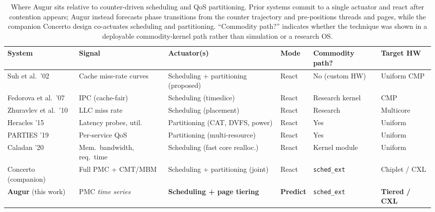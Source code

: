 \documentclass[sigconf,nonacm]{acmart}
\begin{document}
\begin{table}[t]
\centering
\footnotesize
\setlength{\tabcolsep}{6pt}
\renewcommand{\arraystretch}{1.3}
\begin{tabular}{@{}>{\raggedright}p{2.6cm} >{\raggedright}p{3.1cm} >{\raggedright}p{3.5cm} l >{\raggedright}p{2.3cm} >{\raggedright\arraybackslash}p{2.2cm}@{}}
\toprule
\textbf{System} & \textbf{Signal} & \textbf{Actuator(s)} & \textbf{Mode} & \textbf{Commodity path?} & \textbf{Target HW} \\
\midrule
Suh et al.\ '02~\cite{suh2002memory}        & Cache miss-rate curves        & Scheduling + partitioning (proposed) & React   & No (custom HW)   & Uniform CMP \\
Fedorova et al.\ '07~\cite{fedorova2007isolation} & IPC (cache-fair)        & Scheduling (timeslice)               & React   & Research kernel  & CMP \\
Zhuravlev et al.\ '10~\cite{zhuravlev2010contention} & LLC miss rate        & Scheduling (placement)               & React   & Research         & Multicore \\
Heracles '15~\cite{lo2015heracles}          & Latency probes, util.\        & Partitioning (CAT, DVFS, power)      & React   & Yes              & Uniform \\
PARTIES '19~\cite{chen2019parties}          & Per-service QoS               & Partitioning (multi-resource)        & React   & Yes              & Uniform \\
Caladan '20~\cite{fried2020caladan}         & Mem.\ bandwidth, req.\ time   & Scheduling (fast core realloc.)      & React   & Kernel module    & Uniform \\
Concerto (companion)                        & Full PMC + CMT/MBM            & Scheduling + partitioning (joint)    & React   & \texttt{sched\_ext} & Chiplet / CXL \\
\textbf{Augur} (this work)                  & PMC \emph{time series}        & \textbf{Scheduling + page tiering}   & \textbf{Predict} & \texttt{sched\_ext} & \textbf{Tiered / CXL} \\
\bottomrule
\end{tabular}
\caption{Where Augur sits relative to counter-driven scheduling and QoS
partitioning. Prior systems commit to a single actuator and react after
contention appears; Augur instead forecasts phase transitions from the counter
trajectory and pre-positions threads and pages, while the companion Concerto
design co-actuates scheduling and partitioning. ``Commodity path?'' indicates
whether the technique was shown in a deployable commodity-kernel path rather than
simulation or a research OS.}
\label{tab:related}
\end{table}
\end{document}
